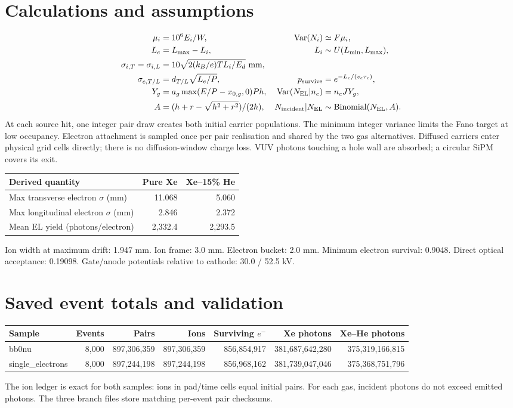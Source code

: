 \documentclass[11pt]{article}
\begin{document}
\section*{Calculations and assumptions}
\begin{align*}
\mu_i &= 10^6 E_i/W, &\operatorname{Var}(N_i)&\simeq F\mu_i,\\
L_e &= L_{\max}-L_i, & L_i&\sim U(L_{\min},L_{\max}),\\
\sigma_{i,T}=\sigma_{i,L}&=10\sqrt{2(k_B/e)TL_i/E_d}\ {\rm mm},\\
\sigma_{e,T/L}&=d_{T/L}\sqrt{L_e/P}, &p_{\rm survive}&=e^{-L_e/(v_e\tau_e)},\\
Y_g&=a_g\max(E/P-x_{0,g},0)Ph, &\operatorname{Var}(N_{\rm EL}|n_e)&=n_e JY_g,\\
A&=(h+r-\sqrt{h^2+r^2})/(2h), &N_{\rm incident}|N_{\rm EL}&\sim\mathrm{Binomial}(N_{\rm EL},A).
\end{align*}
At each source hit, one integer pair draw creates both initial carrier populations. The minimum integer variance limits the Fano target at low occupancy. Electron attachment is sampled once per pair realisation and shared by the two gas alternatives. Diffused carriers enter physical grid cells directly; there is no diffusion-window charge loss. VUV photons touching a hole wall are absorbed; a circular SiPM covers its exit.
\par\medskip
\begin{tabular}{lrr}\toprule Derived quantity & Pure Xe & Xe--15\% He\\\midrule
Max transverse electron $\sigma$ (mm) & 11.068 & 5.060\\
Max longitudinal electron $\sigma$ (mm) & 2.846 & 2.372\\
Mean EL yield (photons/electron) & 2,332.4 & 2,293.5\\
\bottomrule\end{tabular}
\par Ion width at maximum drift: 1.947 mm. Ion frame: 3.0 mm. Electron bucket: 2.0 mm. Minimum electron survival: 0.9048. Direct optical acceptance: 0.19098. Gate/anode potentials relative to cathode: 30.0 / 52.5 kV.
\section*{Saved event totals and validation}
\begin{center}\small\begin{tabular}{lrrrrrr}\toprule Sample & Events & Pairs & Ions & Surviving $e^-$ & Xe photons & Xe--He photons\\\midrule
bb0nu & 8,000 & 897,306,359 & 897,306,359 & 856,854,917 & 381,687,642,280 & 375,319,166,815\\
single\_electrons & 8,000 & 897,244,198 & 897,244,198 & 856,968,162 & 381,739,047,046 & 375,368,751,796\\
\bottomrule\end{tabular}\end{center}
\par The ion ledger is exact for both samples: ions in pad/time cells equal initial pairs. For each gas, incident photons do not exceed emitted photons. The three branch files store matching per-event pair checksums.
\end{document}

